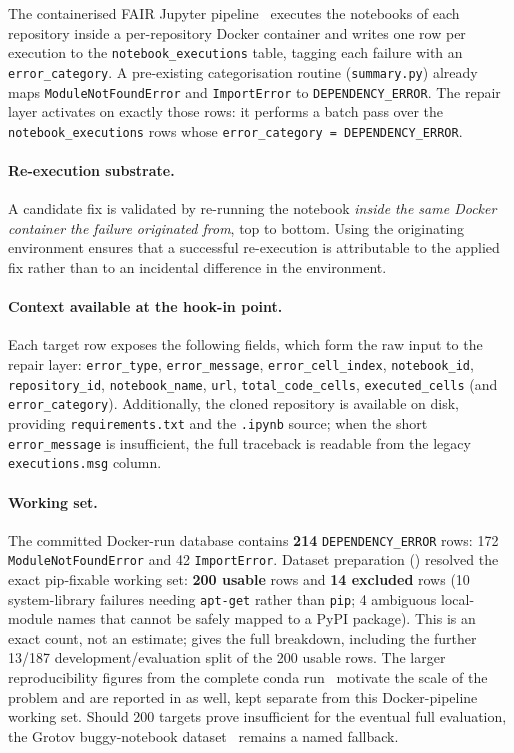 The containerised FAIR Jupyter pipeline~\cite{samuel2025docker}
executes the notebooks of each repository inside a per-repository Docker
container and writes one row per execution to the
\texttt{notebook\_executions} table, tagging each failure with an
\texttt{error\_category}. A pre-existing categorisation routine
(\texttt{summary.py}) already maps \texttt{ModuleNotFoundError} and
\texttt{ImportError} to \texttt{DEPENDENCY\_ERROR}. The repair layer
activates on exactly those rows: it performs a batch pass over the
\texttt{notebook\_executions} rows whose
\texttt{error\_category = DEPENDENCY\_ERROR}.

\paragraph{Re-execution substrate.}
A candidate fix is validated by re-running the notebook \emph{inside the
same Docker container the failure originated from}, top to bottom. Using
the originating environment ensures that a successful re-execution is
attributable to the applied fix rather than to an incidental difference
in the environment.

\paragraph{Context available at the hook-in point.}
Each target row exposes the following fields, which form the raw input to
the repair layer:
\texttt{error\_type}, \texttt{error\_message}, \texttt{error\_cell\_index},
\texttt{notebook\_id}, \texttt{repository\_id}, \texttt{notebook\_name},
\texttt{url}, \texttt{total\_code\_cells}, \texttt{executed\_cells}
(and \texttt{error\_category}).
Additionally, the cloned repository is available on disk, providing
\texttt{requirements.txt} and the \texttt{.ipynb} source; when the short
\texttt{error\_message} is insufficient, the full traceback is readable
from the legacy \texttt{executions.msg} column.

\paragraph{Working set.}
The committed Docker-run database contains \textbf{214}
\texttt{DEPENDENCY\_ERROR} rows: 172 \texttt{ModuleNotFoundError} and 42
\texttt{ImportError}. Dataset preparation () resolved
the exact pip-fixable working set: \textbf{200 usable} rows and
\textbf{14 excluded} rows (10 system-library failures needing
\texttt{apt-get} rather than \texttt{pip}; 4 ambiguous local-module names
that cannot be safely mapped to a PyPI package). This is an exact count, not
an estimate;  gives the full breakdown, including
the further 13/187 development/evaluation split of the 200 usable rows. The
larger reproducibility figures from the complete conda
run~\cite{samuel2024gigascience} motivate the scale of the problem and are
reported in  as well, kept separate from this
Docker-pipeline working set. Should 200 targets prove insufficient for the
eventual full evaluation, the Grotov buggy-notebook
dataset~\cite{grotov2024untangling} remains a named fallback.

